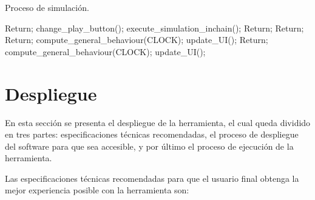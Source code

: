 \begin{algorithm}[h]
	\caption{Proceso de simulación.}
	\label{alg:core_simulator_pseudocode}
  	\scriptsize
	\begin{algorithmic}[1]
		    \State Return;
		  \EndIf		
		  \State change\_play\_button();
		  \State execute\_simulation\_inchain();
		\EndFunction
		    \State Return;
		   \EndIf	
		    \State Return;
		   \EndIf	
		   \EndIf
		   \EndIf	
		\EndFunction
		    \State Return;
		\EndIf
		\State compute\_general\_behaviour(CLOCK); 
		\State update\_UI();		
		\EndFunction
		    \State Return;
		\EndIf
		\Do
		\State compute\_general\_behaviour(CLOCK); 
		 
		\State update\_UI(); 
		\EndFunction
	\end{algorithmic}
\end{algorithm}
\clearpage

\section{Despliegue}
\label{sec:deployment}

En esta sección se presenta el despliegue de la herramienta, el cual queda dividido en tres partes: especificaciones técnicas recomendadas, el proceso de despliegue del \gls{software} para que sea accesible, y por último el proceso de ejecución de la herramienta.

Las especificaciones técnicas recomendadas para que el usuario final obtenga la mejor experiencia posible con la herramienta son:

